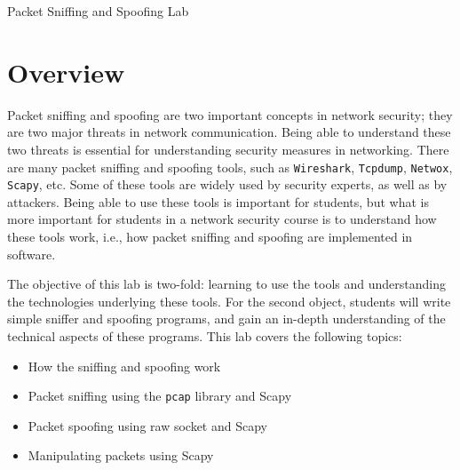 



\newcommand{\pcap} {\texttt{pcap}\xspace}
\newcommand{\telnet} {\texttt{telnet}\xspace}







\begin{center}
{\LARGE Packet Sniffing and Spoofing Lab}
\end{center}



\setcounter{task}{1}
\newcommand{\tasks} {\bf {\noindent (\arabic{task})} \addtocounter{task}{1} \,}

\section{Overview}

Packet sniffing and spoofing are two important concepts in
network security; they are two major threats in network 
communication. Being able to understand these two threats 
is essential for understanding security measures in 
networking. There are many packet sniffing and spoofing tools,
such as {\tt Wireshark}, {\tt Tcpdump}, {\tt Netwox}, \texttt{Scapy}, etc.
Some of these tools are widely used by security experts, as well as by
attackers. Being able to use these tools is important
for students, but what is more important for students in 
a network security course is to understand how these tools work,
i.e., how packet sniffing and spoofing are implemented  
in software.

The objective of this lab is two-fold: learning to use the tools 
and understanding the technologies underlying these tools. 
For the second object, students will write simple sniffer and spoofing programs,
and gain an in-depth understanding of the technical aspects of these programs.
This lab covers the following topics:


\begin{itemize}[noitemsep]
\item How the sniffing and spoofing work
\item Packet sniffing using the {\tt pcap} library and Scapy
\item Packet spoofing using raw socket and Scapy
\item Manipulating packets using Scapy 
\end{itemize}



